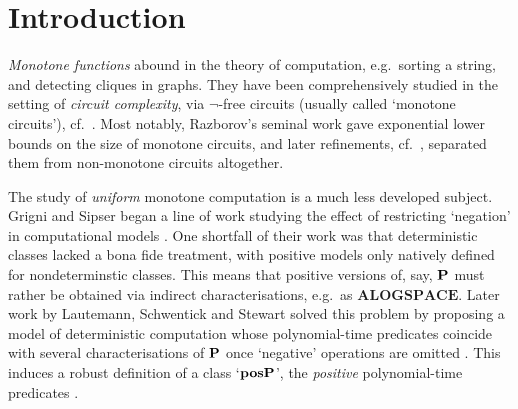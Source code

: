 \documentclass{lmcs}
\begin{document}
\maketitle



\section{Introduction}
\label{sect:intro}

\emph{Monotone functions} abound in the theory of computation, e.g.\ sorting a string, and detecting cliques in graphs.
They have been comprehensively studied in the setting of \emph{circuit complexity}, via $\neg$-free circuits (usually called `monotone circuits'), cf.~\cite{Korshunov:03}.
Most notably, Razborov's seminal work \cite{Razborov85} gave exponential lower bounds on the size of monotone circuits, and later refinements, cf.~\cite{alon1987monotone,tardos1988gap}, separated them from non-monotone circuits altogether.


The study of \emph{uniform} monotone computation is a much less developed subject. Grigni and Sipser began a line of work studying the effect of restricting `negation' in computational models \cite{Grigni:1992:MC:167687.167706,grigni1991structure}.
One shortfall of their work
was that deterministic classes lacked a bona fide treatment, with positive models only natively defined for nondeterminstic classes.
This means that positive versions of, say, $\mathbf{P}$ must rather be obtained via indirect characterisations, e.g.\  as $\mathbf{ALOGSPACE}$.
%
Later work by Lautemann, Schwentick and Stewart solved this problem by proposing a model of deterministic computation whose polynomial-time predicates coincide with several characterisations of $\mathbf{P}$ once `negative' operations are omitted
\cite{LautemannSS96:on-pos-p,LSS98}.
This induces a robust definition of a class `$\mathbf{pos}\mathbf{P}$', the \emph{positive} polynomial-time predicates \cite{Grigni:1992:MC:167687.167706,grigni1991structure}.
\end{document}
